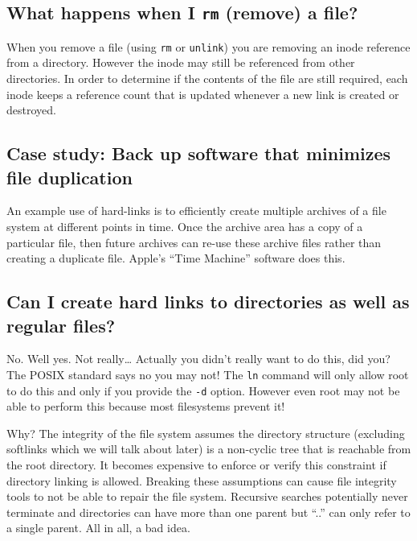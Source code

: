 \subsection{\texorpdfstring{What happens when I \texttt{rm} (remove) a
file?}{What happens when I rm (remove) a file?}}\label{what-happens-when-i-rm-remove-a-file}

When you remove a file (using \texttt{rm} or \texttt{unlink}) you are
removing an inode reference from a directory. However the inode may
still be referenced from other directories. In order to determine if the
contents of the file are still required, each inode keeps a reference
count that is updated whenever a new link is created or destroyed.

\subsection{Case study: Back up software that minimizes file
duplication}\label{case-study-back-up-software-that-minimizes-file-duplication}

An example use of hard-links is to efficiently create multiple archives
of a file system at different points in time. Once the archive area has
a copy of a particular file, then future archives can re-use these
archive files rather than creating a duplicate file. Apple's ``Time
Machine'' software does this.

\subsection{Can I create hard links to directories as well as regular
files?}\label{can-i-create-hard-links-to-directories-as-well-as-regular-files}

No. Well yes. Not really\ldots{} Actually you didn't really want to do
this, did you? The POSIX standard says no you may not! The \texttt{ln}
command will only allow root to do this and only if you provide the
\texttt{-d} option. However even root may not be able to perform this
because most filesystems prevent it!

Why? The integrity of the file system assumes the directory structure
(excluding softlinks which we will talk about later) is a non-cyclic
tree that is reachable from the root directory. It becomes expensive to
enforce or verify this constraint if directory linking is allowed.
Breaking these assumptions can cause file integrity tools to not be able
to repair the file system. Recursive searches potentially never
terminate and directories can have more than one parent but ``..'' can
only refer to a single parent. All in all, a bad idea.

